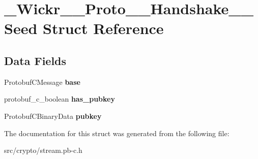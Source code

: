 \hypertarget{struct___wickr_____proto_____handshake_____seed}{}\section{\+\_\+\+Wickr\+\_\+\+\_\+\+Proto\+\_\+\+\_\+\+Handshake\+\_\+\+\_\+\+Seed Struct Reference}
\label{struct___wickr_____proto_____handshake_____seed}
\subsection*{Data Fields}
\begin{DoxyCompactItemize}
\item 
\mbox{\label{struct___wickr_____proto_____handshake_____seed_ab2b6750f6961fa8a998e8ea4cac74e1f}} 
Protobuf\+C\+Message {\bfseries base}
\item 
\mbox{\label{struct___wickr_____proto_____handshake_____seed_a12a178358ed539f175e148cd32f3c5f7}} 
protobuf\+\_\+c\+\_\+boolean {\bfseries has\+\_\+pubkey}
\item 
\mbox{\label{struct___wickr_____proto_____handshake_____seed_af0f810ed0b88166a3de22f2d13629a6f}} 
Protobuf\+C\+Binary\+Data {\bfseries pubkey}
\end{DoxyCompactItemize}


The documentation for this struct was generated from the following file\+:\begin{DoxyCompactItemize}
\item 
src/crypto/stream.\+pb-\/c.\+h\end{DoxyCompactItemize}
